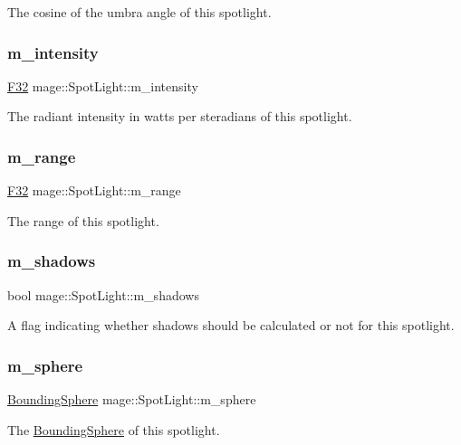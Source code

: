 The cosine of the umbra angle of this spotlight. \hypertarget{classmage_1_1_spot_light_a79110b6604c73210ba13725be7b66606}{}\label{classmage_1_1_spot_light_a79110b6604c73210ba13725be7b66606} 
\subsubsection{\texorpdfstring{m\+\_\+intensity}{m\_intensity}}
{\footnotesize\ttfamily \hyperlink{namespacemage_aa97e833b45f06d60a0a9c4fc22ae02c0}{F32} mage\+::\+Spot\+Light\+::m\+\_\+intensity\hspace{0.3cm}{\ttfamily [private]}}

The radiant intensity in watts per steradians of this spotlight. \hypertarget{classmage_1_1_spot_light_a53922fe395997f12003cd2dbc2f3ca7a}{}\label{classmage_1_1_spot_light_a53922fe395997f12003cd2dbc2f3ca7a} 
\subsubsection{\texorpdfstring{m\+\_\+range}{m\_range}}
{\footnotesize\ttfamily \hyperlink{namespacemage_aa97e833b45f06d60a0a9c4fc22ae02c0}{F32} mage\+::\+Spot\+Light\+::m\+\_\+range\hspace{0.3cm}{\ttfamily [private]}}

The range of this spotlight. \hypertarget{classmage_1_1_spot_light_aa744a471d0f1b39eb5ee435611bb42fe}{}\label{classmage_1_1_spot_light_aa744a471d0f1b39eb5ee435611bb42fe} 
\subsubsection{\texorpdfstring{m\+\_\+shadows}{m\_shadows}}
{\footnotesize\ttfamily bool mage\+::\+Spot\+Light\+::m\+\_\+shadows\hspace{0.3cm}{\ttfamily [private]}}

A flag indicating whether shadows should be calculated or not for this spotlight. \hypertarget{classmage_1_1_spot_light_a81f061d09f67832c73c3cb1f092679b6}{}\label{classmage_1_1_spot_light_a81f061d09f67832c73c3cb1f092679b6} 
\subsubsection{\texorpdfstring{m\+\_\+sphere}{m\_sphere}}
{\footnotesize\ttfamily \hyperlink{classmage_1_1_bounding_sphere}{Bounding\+Sphere} mage\+::\+Spot\+Light\+::m\+\_\+sphere\hspace{0.3cm}{\ttfamily [private]}}

The \hyperlink{classmage_1_1_bounding_sphere}{Bounding\+Sphere} of this spotlight. 